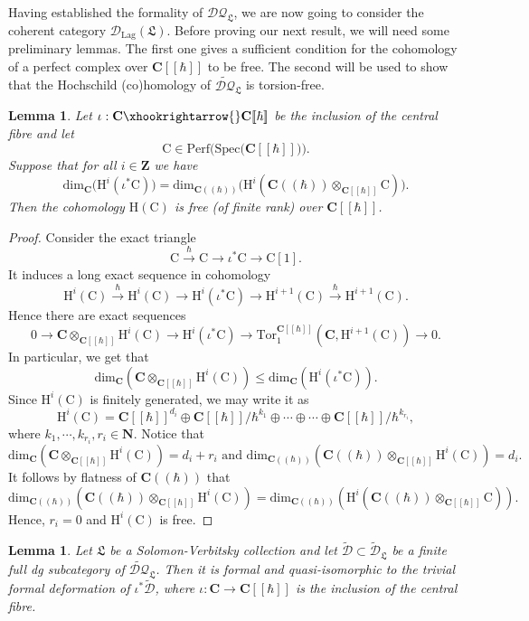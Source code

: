 \documentclass{article}
\theoremstyle{plain}
\newtheorem{lemma}[theorem]{Lemma}
\theoremstyle{definition}
\theoremstyle{remark}
\newcommand{\mr}{\mathrm}
\newcommand{\C}{\mathbf C}
\newcommand{\brak}{[\![\hbar]\!]}
\newcommand{\cbrak}{(\!(\hbar)\!)}
\newcommand{\3}{\vspace{3mm}}
\newcommand{\2}{\vspace{2mm}}
\newcommand{\1}{\vspace{1mm}}
\begin{document}
Having established the formality of $\mathcal{DQ}_\mathfrak{L}$, we are now going to consider the coherent category $\mathcal{D}_\mr{Lag}(\mathfrak{L})$. Before proving our next result, we will need some preliminary lemmas. The first one gives a sufficient condition for the cohomology of a perfect complex over $\C\brak$ to be free. The second will be used to show that the Hochschild (co)homology of $\widetilde{\mathcal{DQ}}_\mathfrak{L}$ is torsion-free.

\2
 \begin{lemma}\label{freelemma}
 Let $\iota : \C \xhookrightarrow{} \C\brak$ be the inclusion of the central fibre and let $$\mr{C} \in \mr{Perf}\big(\mr{Spec}\big(\C\brak\big)\big).$$ Suppose that for all $i\in \mathbf{Z}$ we have $$\mr{dim}_\C\big(\mr{H}^{i}(\iota^{*}\mr{C})\big) = \mr{dim}_{\C\cbrak}\big(\mr{H}^{i}(\C\cbrak\otimes_{\C\brak} \mr{C})\big).$$
 Then the cohomology $\mr{H}(\mr{C})$ is free (of finite rank) over $\C\brak$.
 \end{lemma}
\begin{proof}
 Consider the exact triangle $$\mr{C} \xrightarrow{\hbar} \mr{C} \to \iota^{*}\mr{C} \xrightarrow{} \mr{C}[1].$$ It induces a long exact sequence in cohomology $$\mr{H}^{i}(\mr{C}) \xrightarrow{\hbar} \mr{H}^{i}(\mr{C}) \to \mr{H}^{i}(\iota^{*}\mr{C}) \to \mr{H}^{i+1}(\mr{C}) \xrightarrow{\hbar} \mr{H}^{i+1}(\mr{C}).$$ Hence there are exact sequences $$ 0 \to \C\otimes_{\C\brak}\mr{H}^{i}(\mr{C}) \to \mr{H}^{i}(\iota^{*}\mr{C}) \to \mr{Tor}_{1}^{\C\brak}\left(\C,\mr{H}^{i+1}(\mr{C})\right) \to 0.$$  In particular, we get that $$\mr{dim}_{\C}\left(\C\otimes_{\C\brak}\mr{H}^{i}(\mr{C})\right) \le \mr{dim}_\C\left(\mr{H}^{i}(\iota^{*}\mr{C})\right).$$
 Since $\mr{H}^{i}(\mr{C})$ is finitely generated, we may write it as $$\mr{H}^{i}(\mr{C}) = \C\brak^{d_i}\oplus \C\brak/\hbar^{k_1} \oplus \cdots \oplus \cdots \oplus\C\brak/\hbar^{k_{r_i}},$$ where $k_1,\cdots,k_{r_i},r_i \in \mathbf{N}$. Notice that $$\mr{dim}_{\C}\left(\C\otimes_{\C\brak}\mr{H}^{i}(\mr{C})\right) = d_i + r_i \text{ and } \mr{dim}_{\C\cbrak}\left(\C\cbrak\otimes_{\C\brak}\mr{H}^{i}(\mr{C})\right)=d_i.$$ It follows by flatness of $\C\cbrak$ that $$\mr{dim}_{\C\cbrak}\left(\C\cbrak\otimes_{\C\brak}\mr{H}^{i}(\mr{C})\right)= \mr{dim}_{\C\cbrak}\left(\mr{H}^{i}(\C\cbrak\otimes_{\C\brak} \mr{C})\right).$$ Hence, $r_i=0$ and $\mr{H}^{i}\left(\mr{C}\right)$ is free.
\end{proof}
\begin{lemma}
Let $\mathfrak{L}$ be a Solomon-Verbitsky collection and let $\widetilde{\mathcal{D}}\subset \widetilde{\mathcal{D}}_\mathfrak{L}$ be a finite full dg subcategory of $\widetilde{\mathcal{DQ}}_\mathfrak{L}$. Then it is formal and quasi-isomorphic to the trivial formal deformation of $\iota^*\widetilde{\mathcal{D}}$, where $\iota :\C\to \C\brak$ is the inclusion of the central fibre.
\end{lemma}
\end{document}
